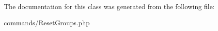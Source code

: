 

The documentation for this class was generated from the following file\+:\begin{DoxyCompactItemize}
\item 
commands/Reset\+Groups.\+php\end{DoxyCompactItemize}
